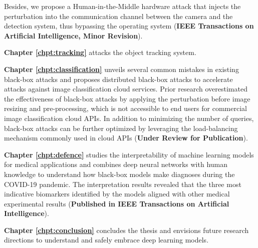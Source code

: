 Besides, we propose a Human-in-the-Middle hardware attack that injects the perturbation into the communication channel between the camera and the detection system, thus bypassing the operating system (\textbf{IEEE Transactions on Artificial Intelligence, Minor Revision}).

\vspace{0.5cm}

\color{gray} \noindent \textbf{Chapter \ref{chpt:tracking}} attacks the object tracking system. \lipsum[1][1-6]\color{black}

\vspace{0.5cm}

\noindent \textbf{Chapter \ref{chpt:classification}} unveils several common mistakes in existing black-box attacks and proposes distributed black-box attacks to accelerate attacks against image classification cloud services. Prior research overestimated the effectiveness of black-box attacks by applying the perturbation before image resizing and pre-processing, which is not accessible to end users for commercial image classification cloud APIs. In addition to minimizing the number of queries, black-box attacks can be further optimized by leveraging the load-balancing mechanism commonly used in cloud APIs (\textbf{Under Review for Publication}).

\vspace{0.5cm}

\noindent \textbf{Chapter \ref{chpt:defence}} studies the interpretability of machine learning models for medical applications and combines deep neural networks with human knowledge to understand how black-box models make diagnoses during the COVID-19 pandemic. The interpretation results revealed that the three most indicative biomarkers identified by the models aligned with other medical experimental results (\textbf{Published in IEEE Transactions on Artificial Intelligence}).

\vspace{0.5cm}

\noindent \textbf{Chapter \ref{chpt:conclusion}} concludes the thesis and envisions future research directions to understand and safely embrace deep learning models. 


